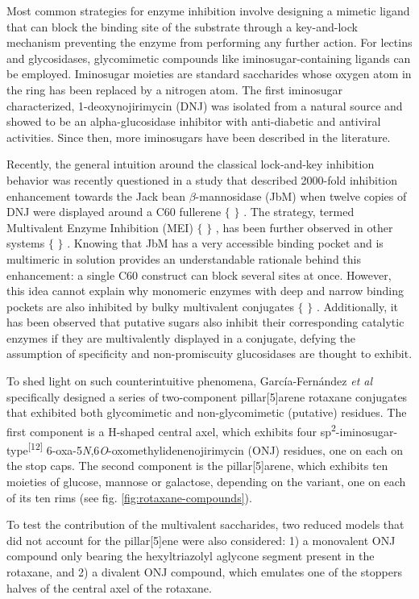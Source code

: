 Most common strategies for enzyme inhibition involve designing a mimetic ligand that can block the binding site of the substrate through a key-and-lock mechanism preventing the enzyme from performing any further action. For lectins and glycosidases, glycomimetic compounds like iminosugar-containing ligands can be employed. Iminosugar moieties are standard saccharides whose oxygen atom in the ring has been replaced by a nitrogen atom. The first iminosugar characterized, 1-deoxynojirimycin (DNJ) was isolated from a natural source and showed to be an alpha-glucosidase inhibitor with anti-diabetic and antiviral activities. Since then, more iminosugars have been described in the literature.

Recently, the general intuition around the classical lock-and-key inhibition behavior was recently questioned in a study that described 2000-fold inhibition enhancement towards the Jack bean $\beta$-mannosidase (JbM) when twelve copies of DNJ were displayed around a C60 fullerene $ \{ $ $ \} $ . The strategy, termed Multivalent Enzyme Inhibition (MEI) $ \{ $ $ \} $ , has been further observed in other systems $ \{ $ $ \} $ . Knowing that JbM has a very accessible binding pocket and is multimeric in solution provides an understandable rationale behind this enhancement: a single C60 construct can block several sites at once. However, this idea cannot explain why monomeric enzymes with deep and narrow binding pockets are also inhibited by bulky multivalent conjugates $ \{ $ $ \} $ . Additionally, it has been observed that putative sugars also inhibit their corresponding catalytic enzymes if they are multivalently displayed in a conjugate, defying the assumption of specificity and non-promiscuity glucosidases are thought to exhibit.

To shed light on such counterintuitive phenomena, García-Fernández \textit{et al }specifically designed a series of two-component pillar[5]arene rotaxane conjugates that exhibited both glycomimetic and non-glycomimetic (putative) residues. The first component is a H-shaped central axel, which exhibits four sp\textsuperscript{2}-iminosugar-type\textsuperscript{[12]} 6-oxa-5\textit{N},6\textit{O}-oxomethylidenenojirimycin (ONJ) residues, one on each on the stop caps. The second component is the pillar[5]arene, which exhibits ten moieties of glucose, mannose or galactose, depending on the variant, one on each of its ten rims (see fig. \ref{fig:rotaxane-compounds}).

To test the contribution of the multivalent saccharides, two reduced models that did not account for the pillar[5]ene were also considered: 1) a monovalent ONJ compound only bearing the hexyltriazolyl aglycone segment present in the rotaxane, and 2) a divalent ONJ compound, which emulates one of the stoppers halves of the central axel of the rotaxane.



